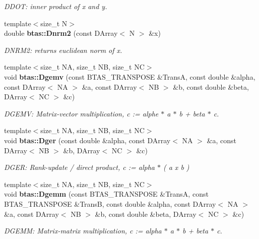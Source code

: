\begin{DoxyCompactItemize}
\begin{DoxyCompactList}\small\item\em D\-D\-O\-T\-: inner product of x and y. \end{DoxyCompactList}\item 
{\footnotesize template$<$size\-\_\-t N$>$ }\\double {\bf btas\-::\-Dnrm2} (const D\-Array$<$ N $>$ \&x)
\begin{DoxyCompactList}\small\item\em D\-N\-R\-M2\-: returns euclidean norm of x. \end{DoxyCompactList}\item 
{\footnotesize template$<$size\-\_\-t N\-A, size\-\_\-t N\-B, size\-\_\-t N\-C$>$ }\\void {\bf btas\-::\-Dgemv} (const B\-T\-A\-S\-\_\-\-T\-R\-A\-N\-S\-P\-O\-S\-E \&Trans\-A, const double \&alpha, const D\-Array$<$ N\-A $>$ \&a, const D\-Array$<$ N\-B $>$ \&b, const double \&beta, D\-Array$<$ N\-C $>$ \&c)
\begin{DoxyCompactList}\small\item\em D\-G\-E\-M\-V\-: Matrix-\/vector multiplication, c \-:= alphe $\ast$ a $\ast$ b + beta $\ast$ c. \end{DoxyCompactList}\item 
{\footnotesize template$<$size\-\_\-t N\-A, size\-\_\-t N\-B, size\-\_\-t N\-C$>$ }\\void {\bf btas\-::\-Dger} (const double \&alpha, const D\-Array$<$ N\-A $>$ \&a, const D\-Array$<$ N\-B $>$ \&b, D\-Array$<$ N\-C $>$ \&c)
\begin{DoxyCompactList}\small\item\em D\-G\-E\-R\-: Rank-\/update / direct product, c \-:= alpha $\ast$ ( a x b ) \end{DoxyCompactList}\item 
{\footnotesize template$<$size\-\_\-t N\-A, size\-\_\-t N\-B, size\-\_\-t N\-C$>$ }\\void {\bf btas\-::\-Dgemm} (const B\-T\-A\-S\-\_\-\-T\-R\-A\-N\-S\-P\-O\-S\-E \&Trans\-A, const B\-T\-A\-S\-\_\-\-T\-R\-A\-N\-S\-P\-O\-S\-E \&Trans\-B, const double \&alpha, const D\-Array$<$ N\-A $>$ \&a, const D\-Array$<$ N\-B $>$ \&b, const double \&beta, D\-Array$<$ N\-C $>$ \&c)
\begin{DoxyCompactList}\small\item\em D\-G\-E\-M\-M\-: Matrix-\/matrix multiplication, c \-:= alpha $\ast$ a $\ast$ b + beta $\ast$ c. \end{DoxyCompactList}\item 

\end{DoxyCompactItemize}

